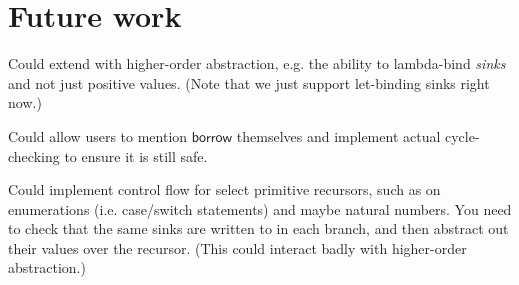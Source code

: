 \documentclass[final]{amsart}
\begin{document}
\section{Future work}

Could extend with higher-order abstraction, e.g. the ability to lambda-bind \emph{sinks} and not just positive values.
(Note that we just support let-binding sinks right now.)

Could allow users to mention $\mathsf{borrow}$ themselves and implement actual cycle-checking to ensure it is still safe.

Could implement control flow for select primitive recursors, such as on enumerations (i.e. case/switch statements) and maybe natural numbers.
You need to check that the same sinks are written to in each branch, and then abstract out their values over the recursor.
(This could interact badly with higher-order abstraction.)
\end{document}
